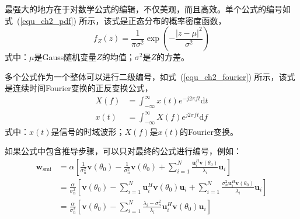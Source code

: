 
最强大的地方在于对数学公式的编辑，不仅美观，而且高效。单个公式的编号如式~(\ref{equ_ch2_pdf}) 所示，该式是正态分布的概率密度函数\cite{Manolakis2005}，
\begin{equation}\label{equ_ch2_pdf}
	f_Z(z)=\frac{1}{\pi\sigma^2}\exp\left(-\frac{|z-\mu|^2}{\sigma^2}\right)
\end{equation}
式中：$\mu$是Gauss随机变量$Z$的均值；$\sigma^2$是$Z$的方差。


多个公式作为一个整体可以进行二级编号，如式~(\ref{equ_ch2_fourier}) 所示，该式是连续时间Fourier变换的正反变换公式\cite{Vetterli2014}，
\begin{subequations}\label{equ_ch2_fourier}
	\begin{align}
		X(f)&=\int_{-\infty}^{\infty}x(t)e^{-j2\pi f t}\mathrm{d}t\\
		x(t)&=\int_{-\infty}^{\infty}X(f)e^{j2\pi f t}\mathrm{d}f
	\end{align}
\end{subequations}
式中：$x(t)$是信号的时域波形；$X(f)$是$x(t)$的Fourier变换。

如果公式中包含推导步骤，可以只对最终的公式进行编号，例如：
\begin{align}
	\bm{w}_{\mathrm{smi}}&=\alpha\left[\frac{1}{\sigma_n^2}\bm{v}(\theta_0)- \frac{1}{\sigma_n^2}\bm{v}(\theta_0)+\sum_{i=1}^{N}\frac{\bm{u}_i^H\bm{v}(\theta_0)}{\lambda_i} \bm{u}_i\right]\nonumber\\
	&=\frac{\alpha}{\sigma_n^2}\left[\bm{v}(\theta_0)- \sum_{i=1}^{N}\bm{u}_i^H\bm{v}(\theta_0)\bm{u}_i+ \sum_{i=1}^{N}\frac{\sigma_n^2\bm{u}_i^H\bm{v}(\theta_0)}{\lambda_i}\bm{u}_i\right]\nonumber\\
	&=\frac{\alpha}{\sigma_n^2}\left[\bm{v}(\theta_0)-\sum_{i=1}^{N} \frac{\lambda_i-\sigma_n^2}{\lambda_i}\bm{u}_i^H\bm{v}(\theta_0)\bm{u}_i\right]
\end{align}
